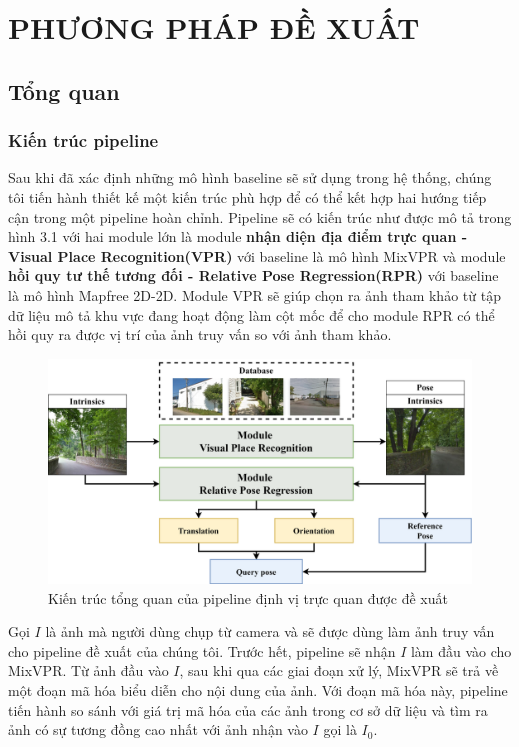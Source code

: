 \chapter{PHƯƠNG PHÁP ĐỀ XUẤT}

\section{Tổng quan}
\subsection{Kiến trúc pipeline}
Sau khi đã xác định những mô hình baseline sẽ sử dụng trong hệ thống, chúng tôi tiến hành thiết kế một kiến trúc phù hợp để có thể kết hợp hai hướng tiếp cận trong một pipeline hoàn chỉnh. Pipeline sẽ có kiến trúc như được mô tả trong hình 3.1 với hai module lớn là module \textbf{nhận diện địa điểm trực quan - Visual Place Recognition(VPR)} với baseline là mô hình MixVPR và module \textbf{hồi quy tư thế tương đối - Relative Pose Regression(RPR)} với baseline là mô hình Mapfree 2D-2D. Module VPR sẽ giúp chọn ra ảnh tham khảo từ tập dữ liệu mô tả khu vực đang hoạt động làm cột mốc để cho module RPR có thể hồi quy ra được vị trí của ảnh truy vấn so với ảnh tham khảo.

\begin{figure}[htbp]
  \centering
  \includegraphics[width=\textwidth]{pics/Proposal/arch.png}
  \caption{Kiến trúc tổng quan của pipeline định vị trực quan được đề xuất}
\end{figure}

Gọi $I$ là ảnh mà người dùng chụp từ camera và sẽ được dùng làm ảnh truy vấn cho pipeline đề xuất của chúng tôi. Trước hết, pipeline sẽ nhận $I$ làm đầu vào cho MixVPR. Từ ảnh đầu vào $I$, sau khi qua các giai đoạn xử lý, MixVPR sẽ trả về một đoạn mã hóa biểu diễn cho nội dung của ảnh. Với đoạn mã hóa này, pipeline tiến hành so sánh với giá trị mã hóa của các ảnh trong cơ sở dữ liệu và tìm ra ảnh có sự tương đồng cao nhất với ảnh nhận vào $I$ gọi là $I_0$.

